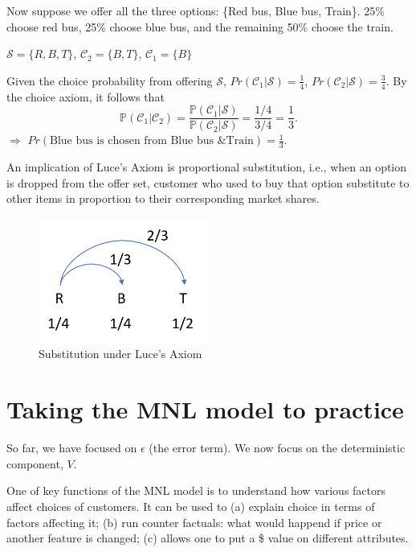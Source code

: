 \documentclass[11pt]{article}
\begin{document}
Now suppose we offer all the three options: \{Red bus, Blue bus, Train\}. 25\% choose red bus, 25\% choose blue bus, and the remaining 50\% choose the train.

$\mathcal{S}=\{R,B,T\}$, $\mathcal{C}_2=\{B,T\}$, $\mathcal{C}_1=\{B\}$

Given the choice probability from offering $\mathcal{S}$, $Pr(\mathcal{C}_1|\mathcal{S})=\frac{1}{4}$, $Pr(\mathcal{C}_2|\mathcal{S})=\frac{3}{4}$. By the choice axiom, it follows that
\begin{equation}
\mathbb{P}(\mathcal{C}_1|\mathcal{C}_2)=\dfrac{\mathbb{P}(\mathcal{C}_1|\mathcal{S})}{\mathbb{P}(\mathcal{C}_2|\mathcal{S})}=\dfrac{1/4}{3/4}=\frac{1}{3}.
\end{equation} 
$\Rightarrow$ $Pr(\text{Blue bus is chosen from Blue bus \& Train})=\frac{1}{3}$.

An implication of Luce's Axiom is proportional substitution, i.e., when an option is dropped from the offer set, customer who used to buy that option substitute to other items in proportion to their corresponding market shares.

\begin{figure}[H]
	\centering
	\includegraphics[width=0.5\textwidth]{f3.png}
	\caption{Substitution under Luce's Axiom}
\end{figure}

\section{Taking the MNL model to practice}
So far, we have focused on $\epsilon$ (the error term). We now focus on the deterministic component, $V$.

One of key functions of the MNL model is to understand how various factors affect choices of customers. It can be used to (a) explain choice in terms of factors affecting it; (b) run counter factuals: what would happend if price or another feature is changed; (c) allows one to put a \$ value on different attributes.
\end{document}
